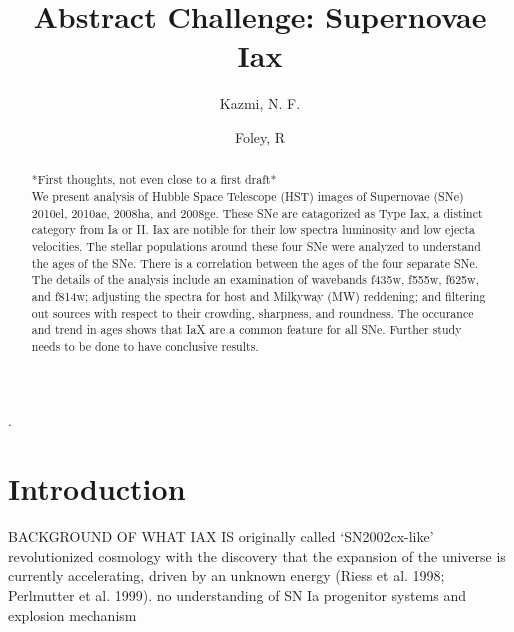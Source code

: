 \documentclass[preprint2]{aastex}
\begin{document}
\title{Abstract Challenge: Supernovae Iax }

\author{Kazmi, N. F.}
\author{Foley, R}

\begin{abstract}
*First thoughts, not even close to a first draft*\\
We present analysis of Hubble Space Telescope (HST) images of Supernovae (SNe)
 2010el, 2010ae, 2008ha, and 2008ge. These SNe are catagorized as Type Iax, a
 distinct category from Ia or II. Iax are notible for their low spectra luminosity and low
 ejecta velocities. The stellar populations around these four SNe were analyzed to
 understand the ages of the SNe. There is a correlation between the ages of the four
 separate SNe. The details of the analysis include an examination of wavebands 
 f435w, f555w, f625w, and f814w; adjusting the spectra for host and Milkyway (MW)
 reddening; and filtering out sources with respect to their crowding, sharpness, and
 roundness. The occurance and trend in ages shows that IaX are a common feature for
 all SNe. Further study needs to be done to have conclusive results. 

\end{abstract}.



\section{Introduction}
BACKGROUND OF WHAT IAX IS
originally called ‘SN2002cx-like'
revolutionized cosmology with the discovery that the
expansion of the universe is currently accelerating, driven by an unknown energy
(Riess et al. 1998; Perlmutter et al. 1999).
 no understanding of SN Ia progenitor systems and explosion mechanism
\end{document}
